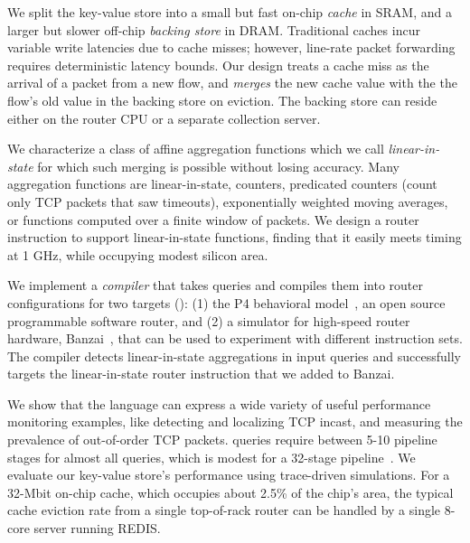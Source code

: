 We split the key-value store into a small but fast on-chip {\em cache} in SRAM,
and a larger but slower off-chip {\em backing store} in DRAM. Traditional caches
incur variable write latencies due to cache misses; however, line-rate packet
forwarding requires deterministic latency bounds. Our design treats a cache miss
as the arrival of a packet from a new flow, and {\em merges} the new cache value
with the the flow's old value in the backing store on eviction. The backing
store can reside either on the router CPU or a separate collection server.

We characterize a class of affine aggregation functions which we call {\em
  linear-in-state} for which
such merging is possible without losing accuracy. Many aggregation functions are
linear-in-state, \eg counters, predicated counters (\eg count only TCP packets
that saw timeouts), exponentially weighted moving averages, or functions
computed over a finite window of packets.  We design a router instruction to
support linear-in-state functions, finding that it easily meets
timing at 1 GHz, while occupying modest silicon area.

 We implement a {\em compiler} that takes \TheSystem
queries and compiles them into router configurations for two targets
(): (1) the P4 behavioral model~\cite{p4-bmv2}, an open source
programmable software router, and (2) a simulator for high-speed router
hardware, Banzai~\cite{domino_sigcomm}, that can be used to experiment with
different instruction sets.  The \TheSystem compiler detects linear-in-state
aggregations in input queries and successfully targets the linear-in-state router
instruction that we added to Banzai.

We show that the \TheSystem language can express a wide variety of useful
performance monitoring examples, like detecting and localizing TCP incast, and
measuring the prevalence of out-of-order TCP packets. \TheSystem queries require
between 5-10 pipeline stages for almost all queries, which is modest for a
32-stage pipeline~\cite{rmt}. We evaluate our key-value store's performance
using trace-driven simulations. For a 32-Mbit on-chip cache, which occupies
about 2.5\% of the chip's area, the typical cache eviction rate from a single
top-of-rack router can be handled by a single 8-core server running
REDIS.
